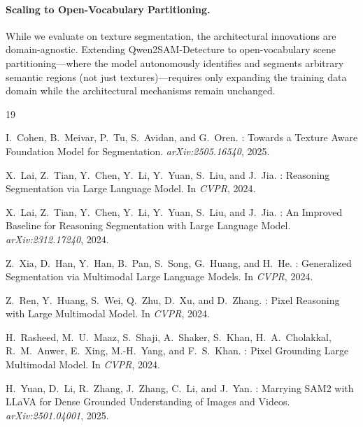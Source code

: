 \documentclass{article}
\begin{document}
\paragraph{Scaling to Open-Vocabulary Partitioning.}
While we evaluate on texture segmentation, the architectural innovations are domain-agnostic. Extending Qwen2SAM-Detecture to open-vocabulary scene partitioning---where the model autonomously identifies and segments arbitrary semantic regions (not just textures)---requires only expanding the training data domain while the architectural mechanisms remain unchanged.



\begin{thebibliography}{19}

I.~Cohen, B.~Meivar, P.~Tu, S.~Avidan, and G.~Oren.
: Towards a Texture Aware Foundation Model for Segmentation.
\newblock \emph{arXiv:2505.16540}, 2025.

X.~Lai, Z.~Tian, Y.~Chen, Y.~Li, Y.~Yuan, S.~Liu, and J.~Jia.
: Reasoning Segmentation via Large Language Model.
\newblock In \emph{CVPR}, 2024.

X.~Lai, Z.~Tian, Y.~Chen, Y.~Li, Y.~Yuan, S.~Liu, and J.~Jia.
: An Improved Baseline for Reasoning Segmentation with Large Language Model.
\newblock \emph{arXiv:2312.17240}, 2024.

Z.~Xia, D.~Han, Y.~Han, B.~Pan, S.~Song, G.~Huang, and H.~He.
: Generalized Segmentation via Multimodal Large Language Models.
\newblock In \emph{CVPR}, 2024.

Z.~Ren, Y.~Huang, S.~Wei, Q.~Zhu, D.~Xu, and D.~Zhang.
: Pixel Reasoning with Large Multimodal Model.
\newblock In \emph{CVPR}, 2024.

H.~Rasheed, M.~U.~Maaz, S.~Shaji, A.~Shaker, S.~Khan, H.~A.~Cholakkal, R.~M.~Anwer, E.~Xing, M.-H.~Yang, and F.~S.~Khan.
: Pixel Grounding Large Multimodal Model.
\newblock In \emph{CVPR}, 2024.

H.~Yuan, D.~Li, R.~Zhang, J.~Zhang, C.~Li, and J.~Yan.
: Marrying {SAM2} with {LLaVA} for Dense Grounded Understanding of Images and Videos.
\newblock \emph{arXiv:2501.04001}, 2025.


\end{thebibliography}
\end{document}
